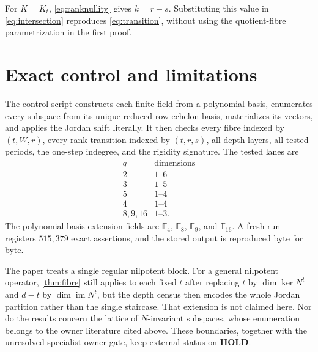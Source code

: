 \documentclass[11pt,a4paper]{amsart}
\newcommand{\F}{\mathbb F}
\newcommand{\im}{\operatorname{im}}
\begin{document}
For $K=K_t$, \eqref{eq:ranknullity} gives $k=r-s$.  Substituting this value
in \eqref{eq:intersection} reproduces \eqref{eq:transition}, without using
the quotient-fibre parametrization in the first proof.

\section{Exact control and limitations}

The control script constructs each finite field from a polynomial basis,
enumerates every subspace from its unique reduced-row-echelon basis,
materializes its vectors, and applies the Jordan shift literally.  It then
checks every fibre indexed by $(t,W,r)$, every rank transition indexed by
$(t,r,s)$, all depth layers, all tested periods, the one-step indegree, and
the rigidity signature.  The tested lanes are
\[
 \begin{array}{c|c}
 q&\text{dimensions}\\ \hline
 2&1\text{--}6\\
 3&1\text{--}5\\
 5&1\text{--}4\\
 4&1\text{--}4\\
 8,9,16&1\text{--}3.
 \end{array}
\]
The polynomial-basis extension fields are $\F_4$, $\F_8$, $\F_9$, and
$\F_{16}$.  A fresh run registers $515{,}379$ exact assertions, and the
stored output is reproduced byte for byte.

The paper treats a single regular nilpotent block.  For a general nilpotent
operator, \cref{thm:fibre} still applies to each fixed $t$ after replacing
$t$ by $\dim\ker N^t$ and $d-t$ by $\dim\im N^t$, but the depth census then
encodes the whole Jordan partition rather than the single staircase.  That
extension is not claimed here.  Nor do the results concern the lattice of
$N$-invariant subspaces, whose enumeration belongs to the owner literature
cited above.  These boundaries, together with the unresolved specialist
owner gate, keep external status on \textbf{HOLD}.



\end{document}
